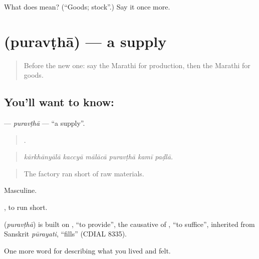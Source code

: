 \begin{tcolorbox}[breakable,colback=teal!4,colframe=teal!35!black,title={Before you move on}]
What does  mean? (\textquotedblleft{}Goods; stock\textquotedblright{}.) Say it once more.
\end{tcolorbox}
\section[\texorpdfstring{\mr{पुरवठा} (puravṭhā)}{पुरवठा (puravṭhā)}]{ (puravṭhā) — a supply}

\label{lesson:MR-C512-puravtha}



\begin{quote}
Before the new one: say the Marathi for production, then the Marathi for goods.
\end{quote}

\subsection*{You'll want to know: }
\textbf{} — \emph{puravṭhā} — \textquotedblleft{}a supply\textquotedblright{}.

\begin{quote}
     .
\end{quote}

\begin{quote}
\emph{kārkhānyālā kaccyā mālācā puravṭhā kamī paḍlā.}
\end{quote}

\begin{quote}
The factory ran short of raw materials.
\end{quote}

Masculine.

  , to run short.

\begin{cousinweb}
\textbf{} (\emph{puravṭhā}) is built on , \textquotedblleft{}to provide\textquotedblright{}, the causative of , \textquotedblleft{}to suffice\textquotedblright{}, inherited from Sanskrit \emph{pūrayati}, \textquotedblleft{}fills\textquotedblright{} (CDIAL 8335).
\end{cousinweb}

\begin{grammarlens}[title={What you've built}]
One more word for describing what you lived and felt.
\end{grammarlens}

